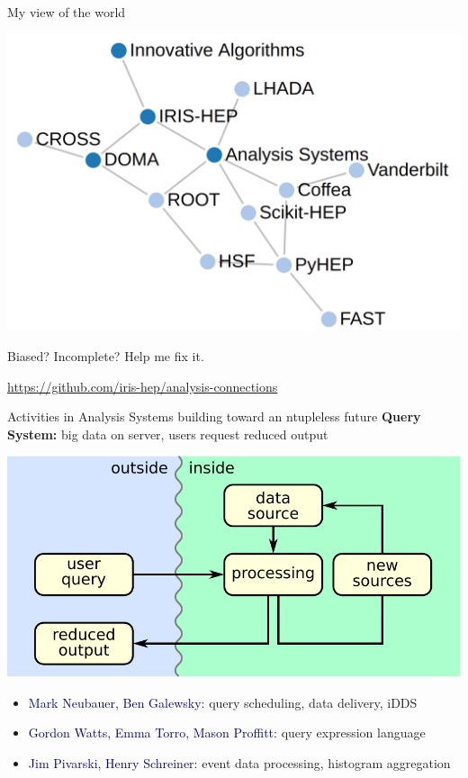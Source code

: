 \documentclass[aspectratio=169]{beamer}
\begin{document}
\begin{frame}{My view of the world}
\vspace{0.25 cm}
\begin{center}
\includegraphics[width=0.8\linewidth]{analysis-connections-cross.png}
\end{center}

\scriptsize
\vspace{-2.5\baselineskip}
Biased? Incomplete? Help me fix it.

\textcolor{blue}{\url{https://github.com/iris-hep/analysis-connections}}
\end{frame}

\begin{frame}{Activities in Analysis Systems building toward an ntupleless future}
\vspace{0.5 cm}
\Large {\bf Query System:} big data on server, users request reduced output
\begin{center}
\includegraphics[width=0.6\linewidth]{basic-block-diagram.pdf}
\end{center}

\normalsize
\begin{itemize}
\item \textcolor{darkblue}{Mark Neubauer, Ben Galewsky:} query scheduling, data delivery, iDDS
\item \textcolor{darkblue}{Gordon Watts, Emma Torro, Mason Proffitt:} query expression language
\item \textcolor{darkblue}{Jim Pivarski, Henry Schreiner:} event data processing, histogram aggregation
\end{itemize}
\end{frame}
\end{document}

